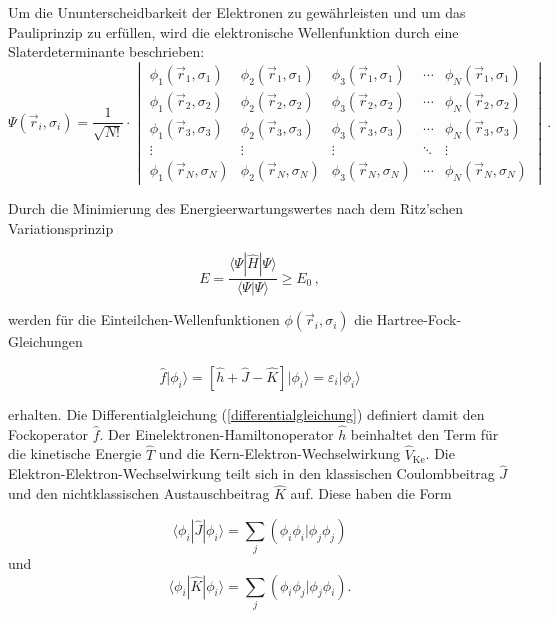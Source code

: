 Um die Ununterscheidbarkeit der Elektronen zu gewährleisten und um das Pau\-li\-prin\-zip\supercite{pauli1925zusammenhang} zu erfüllen, wird die elektronische Wellenfunktion durch eine Sla\-ter\-de\-ter\-mi\-nan\-te\supercite{slater1974self} beschrieben:
\begin{equation}
\Psi(\vec{r}_i,\sigma_i)=\frac{1}{\sqrt{N!}}\cdot\begin{vmatrix}
\phi_1(\vec{r}_1,\sigma_1) & \phi_2(\vec{r}_1,\sigma_1) & \phi_3(\vec{r}_1,\sigma_1) &\cdots & \phi_N(\vec{r}_1,\sigma_1) \\
\phi_1(\vec{r}_2,\sigma_2) & \phi_2(\vec{r}_2,\sigma_2) & \phi_3(\vec{r}_2,\sigma_2) &\cdots & \phi_N(\vec{r}_2,\sigma_2) \\
\phi_1(\vec{r}_3,\sigma_3) & \phi_2(\vec{r}_3,\sigma_3) & \phi_3(\vec{r}_3,\sigma_3) &\cdots & \phi_N(\vec{r}_3,\sigma_3) \\
\vdots & \vdots & \vdots & \ddots & \vdots\\
\phi_1(\vec{r}_N,\sigma_N) & \phi_2(\vec{r}_N,\sigma_N) & \phi_3(\vec{r}_N,\sigma_N) &\cdots & \phi_N(\vec{r}_N,\sigma_N)
\end{vmatrix}\, .
\end{equation}

Durch die Minimierung des Energieerwartungswertes nach dem Ritz'schen Va\-ria\-ti\-ons\-prin\-zip\supercite{macdonald1933successive}

\begin{equation}
E=\frac{\langle\Psi|\hat{H}|\Psi\rangle}{\langle\Psi|\Psi\rangle}\geq E_0\, ,
\end{equation}

werden für die Einteilchen-Wellenfunktionen $\phi(\vec{r}_i,\sigma_i)$ die Hartree-Fock-Gleichungen

\begin{equation}
\hat{f}\vert\phi_i\rangle=\left[\hat{h}+\hat{J}-\hat{K}\right]\vert\phi_i\rangle=\varepsilon_i\vert\phi_i\rangle
\label{differentialgleichung}
\end{equation}

erhalten. Die Differentialgleichung (\ref{differentialgleichung}) definiert damit den Fockoperator $\hat{f}$. Der Einelektronen-Hamiltonoperator $\hat{h}$ beinhaltet den Term für die kinetische Energie $\hat{T}$ und die Kern-Elektron-Wechselwirkung $\hat{V}_{\text{Ke}}$. Die Elektron-Elektron-Wechselwirkung teilt sich in den klassischen Coulombbeitrag $\hat{J}$ und den nichtklassischen Austauschbeitrag $\hat{K}$ auf. Diese haben die Form

\begin{equation}
\langle\phi_i|\hat{J}|\phi_i\rangle=\sum_j\left(\phi_i\phi_i|\phi_j\phi_j\right)
\end{equation}
und 
\begin{equation}
\langle\phi_i|\hat{K}|\phi_i\rangle=\sum_j\left(\phi_i\phi_j|\phi_j\phi_i\right).
\end{equation}

